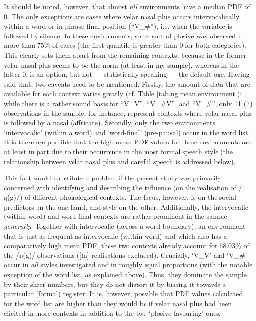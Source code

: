 It should be noted, however, that almost \emph{all} environments have a median PDF of 0.
The only exceptions are cases where velar nasal plus occurs intervocalically within a word or in phrase final position (``V\_\#''), i.e. when the variable is followed by silence.
In these environments, some sort of plosive was observed in more than 75\% of cases (the first quantile is greater than 0 for both categories).
This clearly sets them apart from the remaining contexts, because in the former velar nasal plus seems to be the norm (at least in my sample), whereas in the latter it is an option, but not --- statistically speaking --- the default one.
Having said that, two caveats need to be mentioned.
Firstly, the amount of data that are available for each context varies greatly (cf. Table \ref{tab.ng.mean.environment}): while there is a rather sound basis for ``V\_V'', ``V\_\#V'', and ``V\_\#'', only 11 (7) observations in the sample, for instance, represent contexts where velar nasal plus is followed by a nasal (affricate).
Secondly, only the two environments `intervocalic' (within a word) and `word-final' (pre-pausal) occur in the word list.
It is therefore possible that the high mean PDF values for these environments are at least in part due to their occurrence in the most formal speech style (the relationship between velar nasal plus and careful speech is addressed below).

This fact would constitute a problem if the present study was primarily concerned with identifying and describing the influence (on the realisation of /ŋ(g)/) of different phonological contexts.
The focus, however, is on the social predictors on the one hand, and style on the other.
Additionally, the intervocalic (within word) and word-final contexts are rather prominent in the sample \emph{generally}.
Together with intervocalic (across a word-boundary), an environment that is just as frequent as intervocalic (within word) and which also has a comparatively high mean PDF, these two contexts  already account for 68.03\% of the /ŋ(g)/ observations ([ɪn] realisations excluded).
Crucially, `V\_V' and `V\_\#' occur in \emph{all} styles investigated and in roughly equal proportions (with the notable exception of the word list, as explained above).
Thus, they dominate the sample by their sheer numbers, but they do not distort it by biasing it towards a particular (formal) register.
It is, however, possible that PDF values calculated for the word list are higher than they would be if velar nasal plus had been elicited in more contexts in addition to the two `plosive-favouring' ones.

